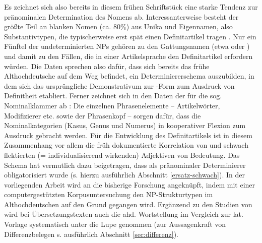 Es zeichnet sich also bereits in diesem frühen Schriftstück eine starke Tendenz zur pränominalen Determination des Nomens ab. Interessanterweise besteht der größte Teil an blanken Nomen (ca. 80\%) aus Unika und Eigennamen, also Substantivtypen, die typischerweise erst spät einen Definitartikel tragen \parencite[s. z.B.][]{Schmuck2014}. Nur ein Fünftel der undeterminierten NPs gehören zu den Gattungsnamen (etwa  oder ) und damit zu den Fällen, die in einer Artikelsprache den Definitartikel erfordern würden. Die Daten sprechen also dafür, dass sich bereits das frühe Althochdeutsche auf dem Weg befindet, ein Determiniererschema auszubilden, in dem sich das ursprüngliche Demonstrativum  zur -Form zum Ausdruck von Definitheit etabliert.  Ferner zeichnet sich in den Daten der  für die sog. Nominalklammer ab \parencite[vgl. u.a.][ ]{Ronneberger-Sibold1994,Ronneberger-Sibold2010,Ronneberger-Sibold2010a,Szczepaniak2011a,Flick2018}: Die einzelnen Phrasenelemente -- Artikelwörter,  Modifizierer etc. sowie der Phrasenkopf -- sorgen dafür, dass die Nominalkategorien (Kasus, Genus und Numerus) in kooperativer Flexion zum Ausdruck gebracht werden. Für die Entwicklung des Definitartikels ist in diesem Zusammenhang vor allem die früh dokumentierte Korrelation von  und schwach flektierten (= individualisierend wirkenden) Adjektiven von Bedeutung. Das Schema hat vermutlich dazu beigetragen, dass   als pränominaler Determinierer obligatorisiert wurde (s. hierzu ausführlich Abschnitt \ref{ersatz-schwach}).  In der vorliegenden Arbeit wird an die bisherige Forschung angeknüpft, indem  mit einer computergestützten Korpusuntersuchung den NP-Strukturtypen im Althochdeutschen auf den Grund gegangen wird. Ergänzend zu den Studien von \textcite{Oubouzar1989,Oubouzar1992} wird bei Übersetzungstexten auch die ahd. Wortstellung im Vergleich zur lat. Vorlage systematisch unter die Lupe genommen (zur Aussagenkraft von Differenzbelegen s. ausführlich Abschnitt \ref{sec:differenz}).   


